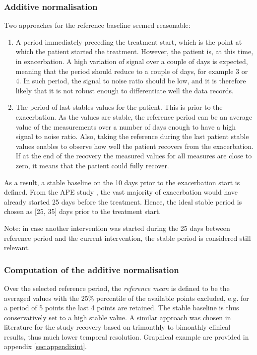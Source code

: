 \subsubsection{Additive normalisation}
Two approaches for the reference baseline seemed reasonable:
\begin{enumerate}
    \item A period immediately preceding the treatment start, which is the point at which the patient started the treatment. However, the patient is, at this time, in exacerbation. A high variation of signal over a couple of days is expected, meaning that the period should reduce to a couple of days, for example 3 or 4. In such period, the signal to noise ratio should be low, and it is therefore likely that it is not robust enough to differentiate well the data records.
    \item The period of last stables values for the patient. This is prior to the exacerbation. As the values are stable, the reference period can be an average value of the measurements over a number of days enough to have a high signal to noise ratio. Also, taking the reference during the last patient stable values enables to observe how well the patient recovers from the exacerbation. If at the end of the recovery the measured values for all measures are close to zero, it means that the patient could fully recover.
\end{enumerate}

As a result, a stable baseline on the 10 days prior to the exacerbation start is defined. From the APE study \cite{damian}, the vast majority of exacerbation would have already started 25 days before the treatment. Hence, the ideal stable period is chosen as [25, 35] days prior to the treatment start.

Note: in case another intervention was started during the 25 days between reference period and the current intervention, the stable period is considered still relevant.


\subsubsection{Computation of the additive normalisation}
Over the selected reference period, the \textit{reference mean} is defined to be the averaged values with the 25\% percentile of the available points excluded, e.g. for a period of 5 points the last 4 points are retained. The stable baseline is thus conservatively set to a high stable value. A similar approach was chosen in literature for the study recovery based on trimonthly to bimonthly clinical results, thus much lower temporal resolution\cite{morgan_2017}. Graphical example are provided in appendix \ref{sec:appendixint}.

